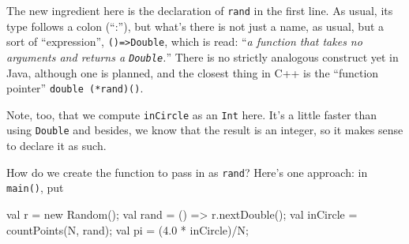 The new ingredient here is the declaration of {\tt rand} in the first line.
As usual, its type follows
a colon (``:''), but what's there is not just a name, as usual, but a sort
of ``expression'', 
{\tt ()=>Double}, which is read:
``{\em a function that takes no arguments and returns a {\tt Double}.}''
There is no strictly analogous construct yet in Java, although one is planned, 
and the closest thing in C++ is the ``function pointer'' {\tt double (*rand)()}.

Note, too, that we compute {\tt inCircle} as an {\tt Int} here.  It's a little
faster than using {\tt Double} and besides, we know that the result is an
integer, so it makes sense to declare it as such.  

How do we create the function to pass in as {\tt rand}?  Here's one approach: in
{\tt main()}, put
\begin{xtennum}[]
val r = new Random();              
val rand = () => r.nextDouble();   
val inCircle = countPoints(N, rand); 
val pi = (4.0 * inCircle)/N;       
\end{xtennum}
 
